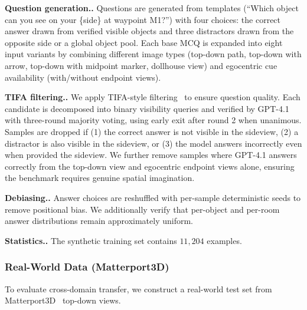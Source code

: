 \documentclass{llmxive}
\providecommand{\paragraph}[1]{\vspace{.5em}\noindent\textbf{#1.}}
\begin{document}
\paragraph{Question generation.}
Questions are generated from templates (``Which object can you see on your \{side\} at waypoint M1?'') with four choices: the correct answer drawn from verified visible objects and three distractors drawn from the opposite side or a global object pool.
Each base MCQ is expanded into eight input variants by combining different image types (top-down path, top-down with arrow, top-down with midpoint marker, dollhouse view) and egocentric cue availability (with/without endpoint views).

\paragraph{TIFA filtering.}
We apply TIFA-style filtering~\cite{hu2023tifa} to ensure question quality.
Each candidate is decomposed into binary visibility queries and verified by GPT-4.1 with three-round majority voting, using early exit after round 2 when unanimous.
Samples are dropped if (1) the correct answer is not visible in the sideview, (2) a distractor is also visible in the sideview, or (3) the model answers incorrectly even when provided the sideview.
We further remove samples where GPT-4.1 answers correctly from the top-down view and egocentric endpoint views alone, ensuring the benchmark requires genuine spatial imagination.

\paragraph{Debiasing.}
Answer choices are reshuffled with per-sample deterministic seeds to remove positional bias.
We additionally verify that per-object and per-room answer distributions remain approximately uniform.

\paragraph{Statistics.}
The synthetic training set contains $11{,}204$ examples.

\subsubsection{Real-World Data (Matterport3D)}

To evaluate cross-domain transfer, we construct a real-world test set from Matterport3D~\cite{chang2017matterport3d} top-down views.
\end{document}

